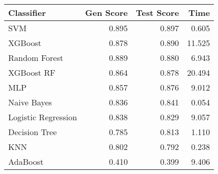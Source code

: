 \begin{tabular}{lrrr}
\toprule
Classifier & Gen Score & Test Score & Time \\
\midrule
SVM & 0.895 & 0.897 & 0.605 \\
XGBoost & 0.878 & 0.890 & 11.525 \\
Random Forest & 0.889 & 0.880 & 6.943 \\
XGBoost RF & 0.864 & 0.878 & 20.494 \\
MLP & 0.857 & 0.876 & 9.012 \\
Naive Bayes & 0.836 & 0.841 & 0.054 \\
Logistic Regression & 0.838 & 0.829 & 9.057 \\
Decision Tree & 0.785 & 0.813 & 1.110 \\
KNN & 0.802 & 0.792 & 0.238 \\
AdaBoost & 0.410 & 0.399 & 9.406 \\
\bottomrule
\end{tabular}
